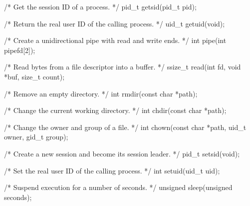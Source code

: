 \documentclass{report}
\begin{document}
\begin{itemize}
\begin{cppcode}
                    /* Get the session ID of a process. */
                    pid_t getsid(pid_t pid);

                    /* Return the real user ID of the calling process. */
                    uid_t getuid(void);

                    /* Create a unidirectional pipe with read and write ends. */
                    int pipe(int pipefd[2]);

                    /* Read bytes from a file descriptor into a buffer. */
                    ssize_t read(int fd, void *buf, size_t count);

                    /* Remove an empty directory. */
                    int rmdir(const char *path);

                    /* Change the current working directory. */
                    int chdir(const char *path);
                \end{cppcode}
                \bigbreak \noindent 
                \begin{cppcode}
                    /* Change the owner and group of a file. */
                    int chown(const char *path, uid_t owner, gid_t group);

                    /* Create a new session and become its session leader. */
                    pid_t setsid(void);

                    /* Set the real user ID of the calling process. */
                    int setuid(uid_t uid);

                    /* Suspend execution for a number of seconds. */
                    unsigned sleep(unsigned seconds);


\end{cppcode}
\end{itemize}
\end{document}
